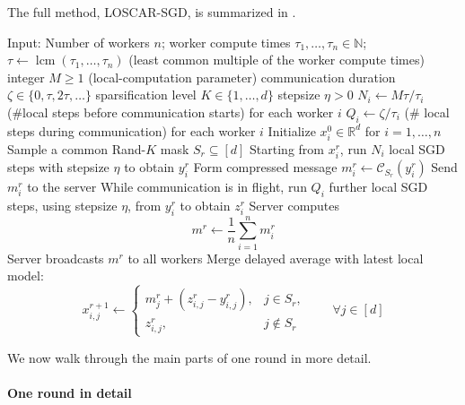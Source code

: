 \documentclass{article}
\theoremstyle{plain}
\theoremstyle{definition}
\newcommand{\algname}[1]{{\color{alggray}\small\sf#1}\xspace}
\newcommand{\loscar}{\algname{\color{oscar} LOSCAR}}
\newcommand{\loscarsgd}{\loscar-\sgd}
\newcommand{\sgd}{\algname{SGD}}
\begin{document}
The full method, \loscarsgd, is summarized in .
% 
\begin{algorithm}[thbp]
\caption{\loscarsgd ({\color{oscar} L}ocal \sgd with {\color{oscar}O}verlapped {\color{oscar} S}parse {\color{oscar} C}orrected {\color{oscar} A}ve{\color{oscar} R}aging)}
\label{alg:general}
\begin{algorithmic}[1]
    \STATE Input: Number of workers $n$;  worker compute times $\tau_1,\dots,\tau_n \in \mathbb N$; $\tau \gets \operatorname{lcm}(\tau_1,\dots,\tau_n)$ (least common multiple of the worker compute times)
    \STATE integer $M \ge 1$ (local-computation parameter)
    \STATE communication duration $\zeta \in \{0,\tau,2\tau,\dots\}$
    \STATE sparsification level $K \in \{1,\dots,d\}$
    \STATE stepsize $\eta > 0$
    \STATE $N_i \gets M\tau/\tau_i$ (\#local steps before communication starts) for each worker $i$
    \STATE $Q_i \gets \zeta/\tau_i$ (\# local steps during communication) for each worker $i$
    \STATE Initialize $x_i^0 \in \mathbb R^d$ for $i=1,\dots,n$
        \STATE Sample a common Rand-$K$ mask $S_r \subseteq [d]$
            \STATE Starting from $x_i^r$, run $N_i$ local SGD steps with stepsize $\eta$ to obtain $y_i^r$
            \STATE Form compressed message $m_i^r \gets \mathcal C_{S_r}(y_i^r)$
            \STATE Send $m_i^r$ to the server
            \STATE While communication is in flight, run $Q_i$ further local SGD steps, using stepsize $\eta$, from $y_i^r$ to obtain $z_i^r$
        \ENDFOR
        \STATE Server computes
        $$%
            m^r \gets \frac1n \sum_{i=1}^n m_i^r
        $$
        \STATE Server broadcasts $m^r$ to all workers
            \STATE Merge delayed average with latest local model:
            \[%
                x_{i,j}^{r+1} \gets
                    \begin{cases}
                        m_j^r + (z_{i,j}^r-y_{i,j}^r), & j \in S_r,\\
                        z_{i,j}^r, & j \notin S_r
                    \end{cases}
                \qquad \forall  j \in [d]
            \]
        \ENDFOR
    \ENDFOR
\end{algorithmic}
\end{algorithm}

We now walk through the main parts of one round in more detail.
% 
\paragraph{One round in detail} %
\label{par:local_computation_within_one_round}
 
\end{document}
